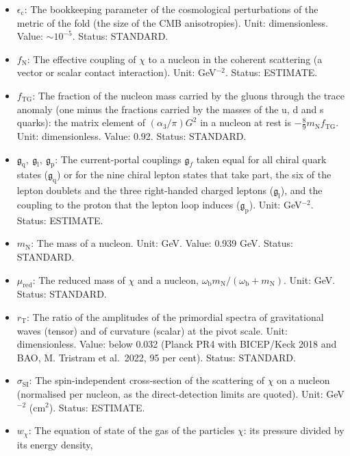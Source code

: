 \documentclass[
  10pt,
]{article}
\begin{document}
\begin{itemize}
  1.09 in UM-3. Status: DERIVED.
\item
  \(\epsilon_{\mathrm{c}}\): The bookkeeping parameter of the
  cosmological perturbations of the metric of the fold (the size of the
  CMB anisotropies). Unit: dimensionless. Value: \(\sim 10^{-5}\).
  Status: STANDARD.
\item
  \(f_{\mathrm{N}}\): The effective coupling of \(\chi\) to a nucleon in
  the coherent scattering (a vector or scalar contact interaction).
  Unit: GeV\(^{-2}\). Status: ESTIMATE.
\item
  \(f_{\mathrm{TG}}\): The fraction of the nucleon mass carried by the
  gluons through the trace anomaly (one minus the fractions carried by
  the masses of the u, d and s quarks): the matrix element of
  \((\alpha_3/\pi)G^2\) in a nucleon at rest is
  \(-\frac89m_{\mathrm{N}}f_{\mathrm{TG}}\). Unit: dimensionless. Value:
  0.92. Status: STANDARD.
\item
  \(\mathfrak{g}_{\mathrm{q}},\ \mathfrak{g}_{\mathrm{l}},\ \mathfrak{g}_{\mathrm{p}}\):
  The current-portal couplings \(\mathfrak{g}_f\) taken equal for all
  chiral quark states (\(\mathfrak{g}_{\mathrm{q}}\)) or for the nine
  chiral lepton states that take part, the six of the lepton doublets
  and the three right-handed charged leptons
  (\(\mathfrak{g}_{\mathrm{l}}\)), and the coupling to the proton that
  the lepton loop induces (\(\mathfrak{g}_{\mathrm{p}}\)). Unit:
  GeV\(^{-2}\). Status: ESTIMATE.
\item
  \(m_{\mathrm{N}}\): The mass of a nucleon. Unit: GeV. Value: 0.939
  GeV. Status: STANDARD.
\item
  \(\mu_{\mathrm{red}}\): The reduced mass of \(\chi\) and a nucleon,
  \(\omega_{\mathrm{b}}m_{\mathrm{N}}/(\omega_{\mathrm{b}} + m_{\mathrm{N}})\).
  Unit: GeV. Status: STANDARD.
\item
  \(r_{\mathrm{T}}\): The ratio of the amplitudes of the primordial
  spectra of gravitational waves (tensor) and of curvature (scalar) at
  the pivot scale. Unit: dimensionless. Value: below 0.032 (Planck PR4
  with BICEP/Keck 2018 and BAO, M. Tristram et al.~2022, 95 per cent).
  Status: STANDARD.
\item
  \(\sigma_{\mathrm{SI}}\): The spin-independent cross-section of the
  scattering of \(\chi\) on a nucleon (normalised per nucleon, as the
  direct-detection limits are quoted). Unit: GeV\(^{-2}\) (cm\(^2\)).
  Status: ESTIMATE.
\item
  \(w_\chi\): The equation of state of the gas of the particles
  \(\chi\): its pressure divided by its energy density,

\end{itemize}
\end{document}

